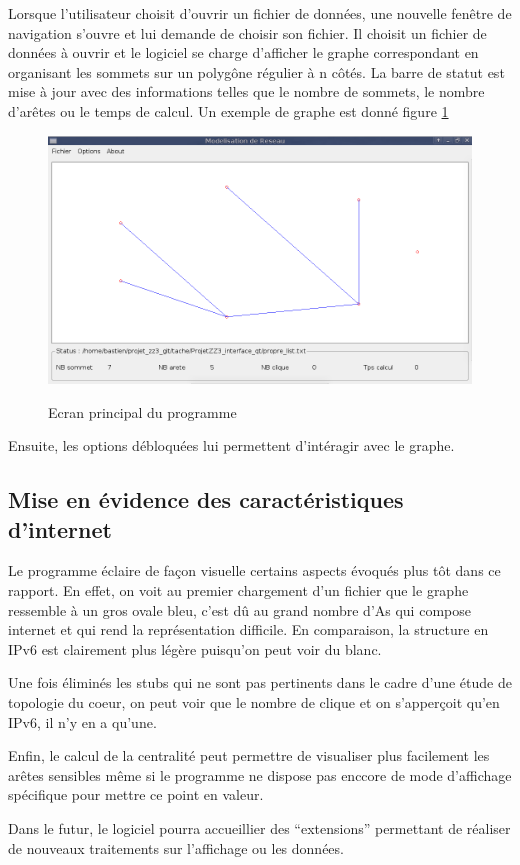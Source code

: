 Lorsque l'utilisateur choisit d'ouvrir un fichier de donn\'ees, une nouvelle fen\^etre de navigation s'ouvre et lui demande de choisir son fichier. Il choisit un fichier de donn\'ees \`a ouvrir et le logiciel se charge d'afficher le graphe correspondant en organisant les sommets sur un polyg\^one r\'egulier \`a n c\^ot\'es.
La barre de statut est mise \`a jour avec des informations telles que le nombre de sommets, le nombre d'ar\^etes ou le temps de calcul. Un exemple de graphe est donn\'e figure \ref{ecran_graph}

\begin{figure}[H]
\centering
 \fbox
 {
 \includegraphics[width=16cm]{./schema/capture_ecran_graph.png}
 }
  \caption{\label{ecran_graph}Ecran principal du programme}
\end{figure}

\par
Ensuite, les options d\'ebloqu\'ees lui permettent d'int\'eragir avec le graphe.

\subsection{Mise en évidence des caractéristiques d'internet}
\par
Le programme \'eclaire de fa\c con visuelle certains aspects \'evoqu\'es plus t\^ot dans ce rapport. En effet, on voit au premier chargement d'un fichier que le graphe ressemble \`a un gros ovale bleu, c'est d\^u au grand nombre d'As qui compose internet et qui rend la repr\'esentation difficile. En comparaison, la structure en IPv6 est clairement plus l\'eg\`ere puisqu'on peut voir du blanc.
\par
Une fois \'elimin\'es les stubs qui ne sont pas pertinents dans le cadre d'une \'etude de topologie du coeur, on peut voir que le nombre de clique et on s'apper\c coit qu'en IPv6, il n'y en a qu'une.
\par
Enfin, le calcul de la centralit\'e peut permettre de visualiser plus facilement les ar\^etes sensibles m\^eme si le programme ne dispose pas enccore de mode d'affichage sp\'ecifique pour mettre ce point en valeur.
\par
Dans le futur, le logiciel pourra accueillier des ``extensions'' permettant de réaliser de nouveaux traitements sur l'affichage ou les données.